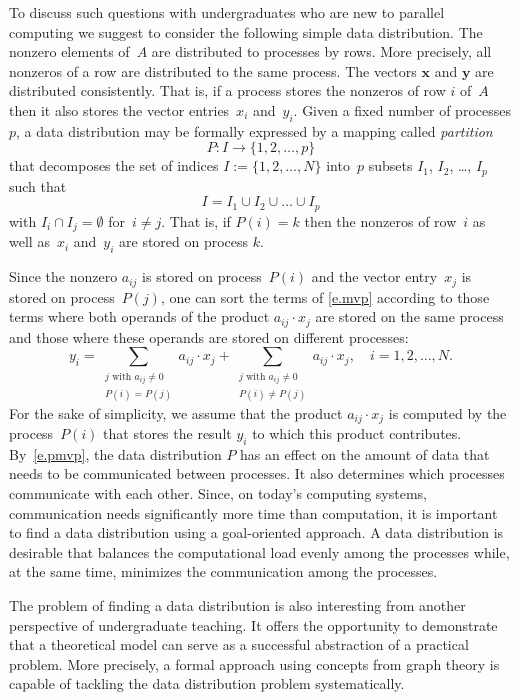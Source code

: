 \documentclass[11pt, twoside,a4paper]{book}
\newcommand{\mat}[1]{\ensuremath{#1}}
\newcommand{\vek}[1]{{\ensuremath{\mathbf #1}}}
\begin{document}
To discuss such questions with undergraduates who are new to parallel computing we
suggest to consider the following simple data distribution. The nonzero elements
of~\mat{A} are distributed to processes by rows. More precisely, all nonzeros of a row
are distributed to the same process. The vectors \vek{x} and \vek{y} are distributed
consistently. That is, if a process stores the nonzeros of row $i$ of~\mat{A} then it
also stores the vector entries~$x_i$ and~$y_i$. Given a fixed number of processes $p$, a
data distribution may be formally expressed by a mapping called \emph{partition}
$$
P: I \rightarrow \{1, 2, \dots, p\}
$$
that decomposes the set of indices $I := \{1, 2, \dots, N\}$ into~$p$ subsets $I_1$,
$I_2$, \dots, $I_p$ such that
$$
I = I_1 \cup I_2 \cup \dots \cup I_p
$$
with $I_i \cap I_j = \emptyset$ for~$i \neq j$. That is, if $P(i)=k$ then the nonzeros of
row~$i$ as well as~$x_i$ and~$y_i$ are stored on process $k$.

Since the nonzero $a_{ij}$ is stored on process~$P(i)$ and the vector entry~$x_j$ is
stored on process~$P(j)$, one can sort the terms of \eqref{e.mvp} according to
those terms where both operands of the product $a_{ij} \cdot x_j$ are stored on the same
process and those where these operands are stored on different processes:
\begin{equation}
\label{e.pmvp}
y_i =
\sum_{ \substack{j \text{ with } a_{ij} \neq 0\\ P(i)=P(j)}} a_{ij} \cdot x_j
+ \sum_{ \substack{j \text{ with } a_{ij} \neq 0\\ P(i)\neq P(j)}} a_{ij} \cdot x_j ,
\quad i = 1, 2, \dots, N.
\end{equation}
For the sake of simplicity, we assume that the product $a_{ij} \cdot x_j$ is computed by
the process~$P(i)$ that stores the result $y_i$ to which this product contributes.
By~\eqref{e.pmvp}, the data distribution $P$ has an effect on the amount of data that
needs to be communicated between processes. It also determines which processes
communicate with each other. Since, on today's computing systems, communication needs
significantly more time than computation, it is important to find a data distribution
using a goal-oriented approach. A data distribution is desirable that balances the
computational load evenly among the processes while, at the same time, minimizes the
communication among the processes.

The problem of finding a data distribution is also interesting from another perspective
of undergraduate teaching. It offers the opportunity to demonstrate that a theoretical
model can serve as a successful abstraction of a practical problem. More precisely, a
formal approach using concepts from graph theory is capable of tackling the data
distribution problem systematically.
\end{document}
